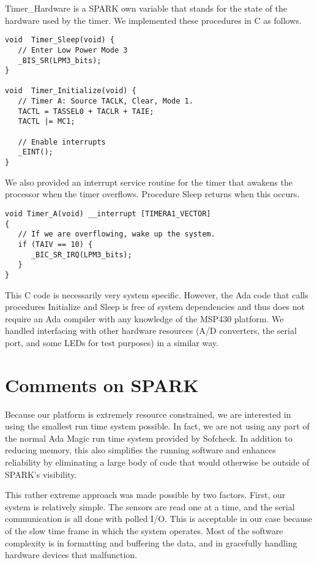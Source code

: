 \documentclass{sig-alternate}
\begin{document}
Timer\_Hardware is a SPARK own variable that stands for the state of the hardware used by the
timer. We implemented these procedures in C as follows.

\begin{verbatim}
void  Timer_Sleep(void) {
   // Enter Low Power Mode 3
   _BIS_SR(LPM3_bits);
}

void  Timer_Initialize(void) {
   // Timer A: Source TACLK, Clear, Mode 1.
   TACTL = TASSEL0 + TACLR + TAIE; 
   TACTL |= MC1;
  
   // Enable interrupts
   _EINT();
}
\end{verbatim}

We also provided an interrupt service routine for the timer that awakens the processor when the
timer overflows. Procedure Sleep returns when this occurs.

\begin{verbatim}
void Timer_A(void) __interrupt [TIMERA1_VECTOR] 
{
   // If we are overflowing, wake up the system.
   if (TAIV == 10) {
      _BIC_SR_IRQ(LPM3_bits);
   }
}
\end{verbatim}

This C code is necessarily very system specific. However, the Ada code that calls procedures
Initialize and Sleep is free of system dependencies and thus does not require an Ada compiler
with any knowledge of the MSP430 platform. We handled interfacing with other hardware resources
(A/D converters, the serial port, and some LEDs for test purposes) in a similar way.

\section{Comments on SPARK}

Because our platform is extremely resource constrained, we are interested in using the smallest
run time system possible. In fact, we are not using any part of the normal Ada Magic run time
system provided by Sofcheck. In addition to reducing memory, this also simplifies the running
software and enhances reliability by eliminating a large body of code that would otherwise be
outside of SPARK's visibility.

This rather extreme approach was made possible by two factors. First, our system is relatively
simple. The sensors are read one at a time, and the serial communication is all done with polled
I/O. This is acceptable in our case because of the slow time frame in which the system operates.
Most of the software complexity is in formatting and buffering the data, and in gracefully
handling hardware devices that malfunction.
\end{document}
